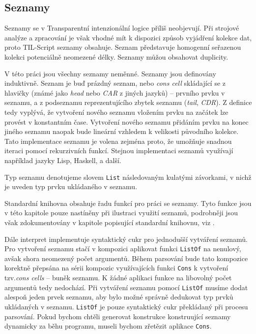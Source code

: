 \subsection{Seznamy}

Seznamy se v Transparentní intenzionální logice příliš neobjevují. Při strojové analýze a
zpracování je však vhodné mít k dispozici způsob vyjádření kolekce dat, proto TIL-Script seznamy
obsahuje. Seznam představuje homogenní seřazenou kolekci potenciálně neomezené délky. Seznamy můžou
obsahovat duplicity.

V této práci jsou všechny seznamy neměnné. Seznamy jsou definovány induktivně. Seznam je buď
prázdný seznam, nebo \textit{cons cell} skládající se z hlavičky (známé jako \textit{head} nebo
\textit{CAR} z jiných jazyků) -- prvního prvku v seznamu, a z podseznamu reprezentujícího
zbytek seznamu (\textit{tail}, \textit{CDR}). Z definice tedy vyplývá, že vytvoření nového seznamu
vložením prvku na začátek lze provést v konstantním čase. Vytvoření nového seznamu přidáním prvku
na konec jiného seznamu naopak bude lineární vzhledem k velikosti původního kolekce. Tato
implementace seznamu je volena zejména proto, že umožňuje snadnou iteraci pomocí rekurzivních funkcí.
Stejnou implementaci seznamů využívají například jazyky Lisp, Haskell, a další\cite{lisp-src}.

Typ seznamu denotujeme slovem \lstinline{List} následovaným kulatými závorkami, v nichž je uveden
typ prvku ukládaného v seznamu.

Standardní knihovna obsahuje řadu funkcí pro práci se seznamy. Tyto funkce jsou v této kapitole
pouze nastíněny při ilustraci využití seznamů, podrobněji jsou však zdokumentovány v kapitole
popisující standardní knihovnu, viz .

Dále interpret implementuje syntaktický cukr pro jednodušší vytváření seznamů. Pro vytvoření
seznamu stačí v kompozici aplikovat funkci \lstinline{ListOf} na nenulový, avšak shora neomezený
počet argumentů. Během parsování bude tato kompozice korektně přepsána na sérii kompozic
využívajících funkci \lstinline{Cons} k vytvoření tzv.\textit{cons cells} -- buněk seznamu. K žádné
aplikaci funkce na libovolný počet argumentů tedy nedochází. Při vytváření seznamu pomocí
\lstinline{ListOf} musíme dodat alespoň jeden prvek seznamu, aby bylo možné správně dedukovat typ
prvků ukládaných v seznamu. \lstinline{ListOf} je pouze syntaktický cukr překládaný při procesu
parsování. Pokud bychom chtěli generovat konstrukce konstruující seznamy dynamicky za běhu programu,
museli bychom zřetězit aplikace \lstinline{Cons}.

